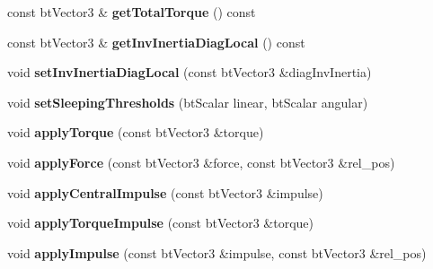 \begin{DoxyCompactItemize}
\item 
\hypertarget{classbt_rigid_body_a2b5f669c697b0962fe8bff363d4eab9b}{const bt\+Vector3 \& {\bfseries get\+Total\+Torque} () const }\label{classbt_rigid_body_a2b5f669c697b0962fe8bff363d4eab9b}

\item 
\hypertarget{classbt_rigid_body_acaf08c40e69ccacaf50a64e03519e3a2}{const bt\+Vector3 \& {\bfseries get\+Inv\+Inertia\+Diag\+Local} () const }\label{classbt_rigid_body_acaf08c40e69ccacaf50a64e03519e3a2}

\item 
\hypertarget{classbt_rigid_body_ac47e4f27b351e24ed180bb0fcfa5a51d}{void {\bfseries set\+Inv\+Inertia\+Diag\+Local} (const bt\+Vector3 \&diag\+Inv\+Inertia)}\label{classbt_rigid_body_ac47e4f27b351e24ed180bb0fcfa5a51d}

\item 
\hypertarget{classbt_rigid_body_a8ed442345551ea2d4e4b30ec19597b69}{void {\bfseries set\+Sleeping\+Thresholds} (bt\+Scalar linear, bt\+Scalar angular)}\label{classbt_rigid_body_a8ed442345551ea2d4e4b30ec19597b69}

\item 
\hypertarget{classbt_rigid_body_aede3cf53474f4b367693b19871692b99}{void {\bfseries apply\+Torque} (const bt\+Vector3 \&torque)}\label{classbt_rigid_body_aede3cf53474f4b367693b19871692b99}

\item 
\hypertarget{classbt_rigid_body_af016720c45cf7ccaf8701d81a28319d9}{void {\bfseries apply\+Force} (const bt\+Vector3 \&force, const bt\+Vector3 \&rel\+\_\+pos)}\label{classbt_rigid_body_af016720c45cf7ccaf8701d81a28319d9}

\item 
\hypertarget{classbt_rigid_body_a82f6590ea4fa13c359ae8809a5112ee7}{void {\bfseries apply\+Central\+Impulse} (const bt\+Vector3 \&impulse)}\label{classbt_rigid_body_a82f6590ea4fa13c359ae8809a5112ee7}

\item 
\hypertarget{classbt_rigid_body_a0084ebc850f06cd043d70ee87e6a3457}{void {\bfseries apply\+Torque\+Impulse} (const bt\+Vector3 \&torque)}\label{classbt_rigid_body_a0084ebc850f06cd043d70ee87e6a3457}

\item 
\hypertarget{classbt_rigid_body_a8274f89d9e6b8fe945282797bd25f377}{void {\bfseries apply\+Impulse} (const bt\+Vector3 \&impulse, const bt\+Vector3 \&rel\+\_\+pos)}\label{classbt_rigid_body_a8274f89d9e6b8fe945282797bd25f377}


\end{DoxyCompactItemize}
